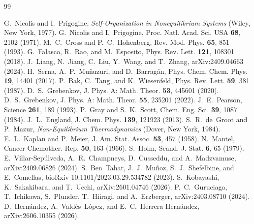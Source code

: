 \documentclass[aps,pre,preprint,superscriptaddress,nofootinbib,floatfix]{revtex4-2}
\begin{document}
\begin{thebibliography}{99}

 G.~Nicolis and I.~Prigogine, \textit{Self-Organization in Nonequilibrium Systems} (Wiley, New York, 1977).
 G.~Nicolis and I.~Prigogine, Proc. Natl. Acad. Sci. USA \textbf{68}, 2102 (1971).
 M.~C.~Cross and P.~C.~Hohenberg, Rev. Mod. Phys. \textbf{65}, 851 (1993).
 G.~Falasco, R.~Rao, and M.~Esposito, Phys. Rev. Lett. \textbf{121}, 108301 (2018).
 J.~Liang, N.~Jiang, C.~Liu, Y.~Wang, and T.~Zhang, arXiv:2409.04663 (2024).
 H.~Serna, A.~P.~Mu\~nuzuri, and D.~Barrag\'an, Phys. Chem. Chem. Phys. \textbf{19}, 14401 (2017).
 P.~Bak, C.~Tang, and K.~Wiesenfeld, Phys. Rev. Lett. \textbf{59}, 381 (1987).
 D.~S.~Grebenkov, J. Phys. A: Math. Theor. \textbf{53}, 445601 (2020).
 D.~S.~Grebenkov, J. Phys. A: Math. Theor. \textbf{55}, 235201 (2022).
 J.~E.~Pearson, Science \textbf{261}, 189 (1993).
 P.~Gray and S.~K.~Scott, Chem. Eng. Sci. \textbf{39}, 1087 (1984).
 J.~L.~England, J. Chem. Phys. \textbf{139}, 121923 (2013).
 S.~R.~de~Groot and P.~Mazur, \textit{Non-Equilibrium Thermodynamics} (Dover, New York, 1984).
 E.~L.~Kaplan and P.~Meier, J. Am. Stat. Assoc. \textbf{53}, 457 (1958).
 N.~Mantel, Cancer Chemother. Rep. \textbf{50}, 163 (1966).
 S.~Holm, Scand. J. Stat. \textbf{6}, 65 (1979).
 E.~Villar-Sep\'ulveda, A.~R.~Champneys, D.~Cusseddu, and A.~Madzvamuse, arXiv:2409.06826 (2024).
 S.~Ben~Tahar, J.~J.~Mu\~noz, S.~J.~Shefelbine, and E.~Comellas, bioRxiv 10.1101/2023.03.29.534782 (2023).
 S.~Kobayashi, K.~Sakakibara, and T.~Uechi, arXiv:2601.04746 (2026).
 P.~C.~Guruciaga, T.~Ichikawa, S.~Plunder, T.~Hiiragi, and A.~Erzberger, arXiv:2403.08710 (2024).
 D.~Hern\'andez, A.~Vald\'es~L\'opez, and E.~C.~Herrera-Hern\'andez, arXiv:2606.10355 (2026).

\end{thebibliography}
\end{document}
